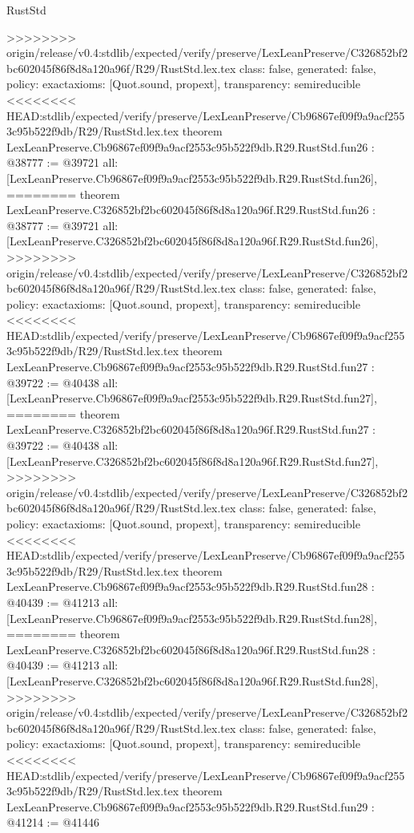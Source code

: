 \begin{lexlean}{RustStd}
\begin{coremodule}
{\begin{coremodule}
{{{{{{{{{{{{{{{{{{{{{{{{{{{{{>>>>>>>> origin/release/v0.4:stdlib/expected/verify/preserve/LexLeanPreserve/C326852bf2bc602045f86f8d8a120a96f/R29/RustStd.lex.tex
  class: false,
  generated: false,
  policy: exact{axioms: [Quot.sound, propext]},
  transparency: semireducible
}
<<<<<<<< HEAD:stdlib/expected/verify/preserve/LexLeanPreserve/Cb96867ef09f9a9acf2553c95b522f9db/R29/RustStd.lex.tex
theorem LexLeanPreserve.Cb96867ef09f9a9acf2553c95b522f9db.R29.RustStd.fun26 : @38777 := @39721 {
  all: [LexLeanPreserve.Cb96867ef09f9a9acf2553c95b522f9db.R29.RustStd.fun26],
========
theorem LexLeanPreserve.C326852bf2bc602045f86f8d8a120a96f.R29.RustStd.fun26 : @38777 := @39721 {
  all: [LexLeanPreserve.C326852bf2bc602045f86f8d8a120a96f.R29.RustStd.fun26],
>>>>>>>> origin/release/v0.4:stdlib/expected/verify/preserve/LexLeanPreserve/C326852bf2bc602045f86f8d8a120a96f/R29/RustStd.lex.tex
  class: false,
  generated: false,
  policy: exact{axioms: [Quot.sound, propext]},
  transparency: semireducible
}
<<<<<<<< HEAD:stdlib/expected/verify/preserve/LexLeanPreserve/Cb96867ef09f9a9acf2553c95b522f9db/R29/RustStd.lex.tex
theorem LexLeanPreserve.Cb96867ef09f9a9acf2553c95b522f9db.R29.RustStd.fun27 : @39722 := @40438 {
  all: [LexLeanPreserve.Cb96867ef09f9a9acf2553c95b522f9db.R29.RustStd.fun27],
========
theorem LexLeanPreserve.C326852bf2bc602045f86f8d8a120a96f.R29.RustStd.fun27 : @39722 := @40438 {
  all: [LexLeanPreserve.C326852bf2bc602045f86f8d8a120a96f.R29.RustStd.fun27],
>>>>>>>> origin/release/v0.4:stdlib/expected/verify/preserve/LexLeanPreserve/C326852bf2bc602045f86f8d8a120a96f/R29/RustStd.lex.tex
  class: false,
  generated: false,
  policy: exact{axioms: [Quot.sound, propext]},
  transparency: semireducible
}
<<<<<<<< HEAD:stdlib/expected/verify/preserve/LexLeanPreserve/Cb96867ef09f9a9acf2553c95b522f9db/R29/RustStd.lex.tex
theorem LexLeanPreserve.Cb96867ef09f9a9acf2553c95b522f9db.R29.RustStd.fun28 : @40439 := @41213 {
  all: [LexLeanPreserve.Cb96867ef09f9a9acf2553c95b522f9db.R29.RustStd.fun28],
========
theorem LexLeanPreserve.C326852bf2bc602045f86f8d8a120a96f.R29.RustStd.fun28 : @40439 := @41213 {
  all: [LexLeanPreserve.C326852bf2bc602045f86f8d8a120a96f.R29.RustStd.fun28],
>>>>>>>> origin/release/v0.4:stdlib/expected/verify/preserve/LexLeanPreserve/C326852bf2bc602045f86f8d8a120a96f/R29/RustStd.lex.tex
  class: false,
  generated: false,
  policy: exact{axioms: [Quot.sound, propext]},
  transparency: semireducible
}
<<<<<<<< HEAD:stdlib/expected/verify/preserve/LexLeanPreserve/Cb96867ef09f9a9acf2553c95b522f9db/R29/RustStd.lex.tex
theorem LexLeanPreserve.Cb96867ef09f9a9acf2553c95b522f9db.R29.RustStd.fun29 : @41214 := @41446 {
}}}}}}}}}}}}}}}}}}}}}}}}}}}}}}}}
\end{coremodule}}
\end{coremodule}
\end{lexlean}
